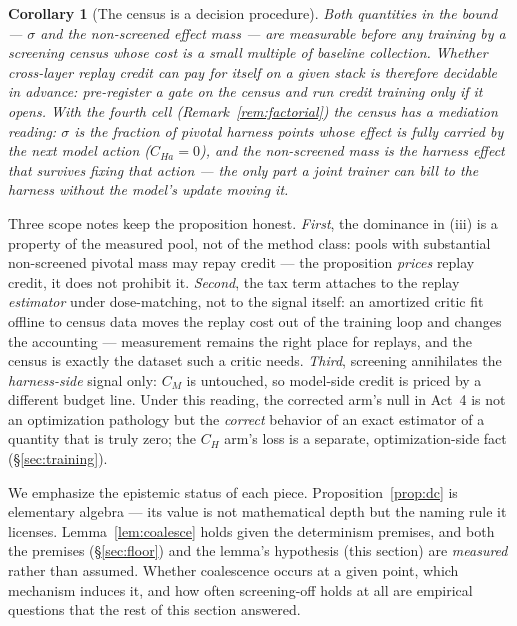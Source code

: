\documentclass{article}
\newtheorem{corollary}{Corollary}
\theoremstyle{remark}
\begin{document}
\begin{corollary}[The census is a decision procedure]
\label{cor:gate}
Both quantities in the bound --- $\sigma$ and the non-screened effect
mass --- are measurable \emph{before any training} by a screening census
whose cost is a small multiple of baseline collection. Whether cross-layer
replay credit can pay for itself on a given stack is therefore decidable in
advance: pre-register a gate on the census and run credit training only if
it opens. With the fourth cell (Remark~\ref{rem:factorial}) the census
has a mediation reading: $\sigma$ is the fraction of pivotal harness
points whose effect is fully carried by the next model action
($C_{Ha} = 0$), and the non-screened mass is the harness effect that
survives fixing that action --- the only part a joint trainer can bill to
the harness without the model's update moving it.
\end{corollary}

Three scope notes keep the proposition honest. \emph{First}, the dominance
in (iii) is a property of the measured pool, not of the method class:
pools with substantial non-screened pivotal mass may repay credit ---
the proposition \emph{prices} replay credit, it does not prohibit it.
\emph{Second}, the tax term attaches to the replay \emph{estimator} under
dose-matching, not to the signal itself: an amortized critic fit offline
to census data moves the replay cost out of the training loop and changes
the accounting --- measurement remains the right place for replays, and
the census is exactly the dataset such a critic needs. \emph{Third},
screening annihilates the \emph{harness-side} signal only: $C_M$ is
untouched, so model-side credit is priced by a different budget line.
Under this reading, the corrected arm's null in Act~4 is not an
optimization pathology but the \emph{correct} behavior of an exact
estimator of a quantity that is truly zero; the $C_H$ arm's loss is a
separate, optimization-side fact (\S\ref{sec:training}).

We emphasize the epistemic status of each piece.
Proposition~\ref{prop:dc} is elementary algebra --- its value is not
mathematical depth but the naming rule it licenses.
Lemma~\ref{lem:coalesce} holds given the determinism premises, and both the
premises (\S\ref{sec:floor}) and the lemma's hypothesis (this section) are
\emph{measured} rather than assumed. Whether coalescence occurs at a given
point, which mechanism induces it, and how often screening-off holds at all
are empirical questions that the rest of this section answered.
\end{document}
